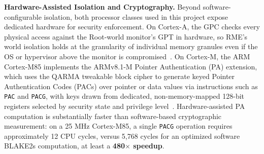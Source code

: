 \textbf{Hardware-Assisted Isolation and Cryptography.}
Beyond software-configurable isolation, both processor classes used in this project expose dedicated hardware for security enforcement.
On Cortex-A, the GPC checks every physical access against the Root-world monitor's GPT in hardware, so RME's world isolation holds at the granularity of individual memory granules even if the OS or hypervisor above the monitor is compromised~\cite{li2022design,armcca}.
On Cortex-M, the ARM Cortex-M85 implements the ARMv8.1-M Pointer Authentication (PA) extension, which uses the QARMA tweakable block cipher to generate keyed Pointer Authentication Codes (PACs) over pointer or data values via instructions such as \texttt{PAC} and \texttt{PACG}, with keys drawn from dedicated, non-memory-mapped 128-bit registers selected by security state and privilege level~\cite{m85,avanzi2017qarma}.
Hardware-assisted PA computation is substantially faster than software-based cryptographic measurement: on a 25 MHz Cortex-M85, a single \texttt{PACG} operation requires approximately 12 CPU cycles, versus 5,768 cycles for an optimized software BLAKE2s computation, at least a \textbf{480$\times$ speedup}.